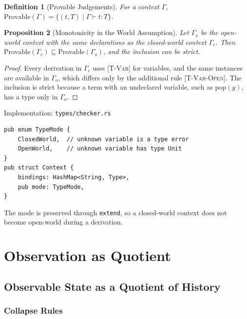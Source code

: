 \documentclass[12pt,oneside,openany]{book}
\theoremstyle{spherepop}
\newtheorem{definition}{Definition}[chapter]
\newtheorem{proposition}[definition]{Proposition}
\theoremstyle{remarkstyle}
\begin{document}
\begin{definition}[Provable Judgements]
For a context $\Gamma$, $\mathrm{Provable}(\Gamma)=\{(t,T)\mid\Gamma\vdash t:T\}$.
\end{definition}

\begin{proposition}[Monotonicity in the World Assumption]
\label{prop:ow-monotone}
Let $\Gamma_o$ be the open-world context with the same declarations as the closed-world context $\Gamma_c$. Then $\mathrm{Provable}(\Gamma_c)\subseteq\mathrm{Provable}(\Gamma_o)$, and the inclusion can be strict.
\end{proposition}

\begin{proof}
Every derivation in $\Gamma_c$ uses \textsc{[T-Var]} for variables, and the same instances are available in $\Gamma_o$, which differs only by the additional rule \textsc{[T-Var-Open]}. The inclusion is strict because a term with an undeclared variable, such as $\mathrm{pop}(y)$, has a type only in $\Gamma_o$.
\end{proof}

\begin{implbox}{Implementation: \texttt{types/checker.rs}}
\begin{lstlisting}
pub enum TypeMode {
    ClosedWorld,  // unknown variable is a type error
    OpenWorld,    // unknown variable has type Unit
}
pub struct Context {
    bindings: HashMap<String, Type>,
    pub mode: TypeMode,
}
\end{lstlisting}
The mode is preserved through \texttt{extend}, so a closed-world context does not become open-world during a derivation.
\end{implbox}

\part{Observation as Quotient}

\chapter{Observable State as a Quotient of History}
\label{ch:quotient}

\section{Collapse Rules}
\end{document}
